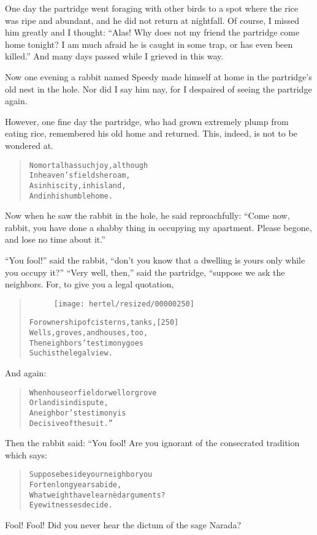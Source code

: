 \documentclass[article, twoside, 10pt]{memoir}
\renewenvironment{verbatim}{%
\begin{quote}%
\vskip -10pt%
\begin{alltt}\normalfont\small}{\end{alltt}%
\end{quote}%
\vskip -10pt
} %
\begin{document}
One day the partridge went foraging with other birds to a spot
where the rice was ripe and abundant, and he did not return at
nightfall. Of course, I missed him greatly and I thought:
``Alas! Why does not my friend the partridge come home tonight? I am much afraid he is caught in some trap, or has even been killed.''
And many days passed while I grieved in this way.

Now one evening a rabbit named Speedy made himself at home in the
partridge's old nest in the hole. Nor did I say him nay, for I
despaired of seeing the partridge again.

However, one fine day the partridge, who had grown extremely plump
from eating rice, remembered his old home and returned. This,
indeed, is not to be wondered at.

\begin{verbatim}
No mortal has such joy, although
    In heaven's fields he roam,
As in his city, in his land,
    And in his humble home.
\end{verbatim}
Now when he saw the rabbit in the hole, he said reproachfully:
``Come now, rabbit, you have done a shabby thing in occupying my apartment. Please begone, and lose no time about it.''

``You fool!'' said the rabbit,
``don't you know that a dwelling is yours only while you occupy it?''
``Very well, then,'' said the partridge, “suppose we ask the
neighbors. For, to give you a legal quotation,

\begin{verbatim}
\begin{figure}[p]\texttt{[image: hertel/resized/00000250]}\end{figure}For ownership of cisterns, tanks,                       [250]
    Wells, groves, and houses, too,
The neighbors' testimony goes{\textemdash}
    Such is the legal view.
\end{verbatim}
And again:

\begin{verbatim}
When house or field or well or grove
    Or land is in dispute,
A neighbor's testimony is
    Decisive of the suit.”
\end{verbatim}
Then the rabbit said: “You fool! Are you ignorant of the
consecrated tradition which says:

\begin{verbatim}
Suppose beside your neighbor you
    For ten long years abide,
What weight have learnèd arguments?
    Eyewitnesses decide.
\end{verbatim}
Fool! Fool! Did you never hear the dictum of the sage Narada?
\end{document}
